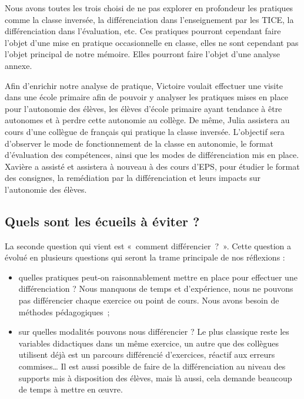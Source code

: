
Nous avons toutes les trois choisi de ne pas explorer en profondeur les pratiques comme la classe inversée, la différenciation dans l’enseignement par les TICE, la différenciation dans l’évaluation, etc. Ces pratiques pourront cependant faire l’objet d’une mise en pratique occasionnelle en classe, elles ne sont cependant pas l’objet principal de notre mémoire. Elles pourront faire l’objet d’une analyse annexe.

Afin d’enrichir notre analyse de pratique, Victoire voulait effectuer une visite dans une école primaire afin de pouvoir y analyser les pratiques mises en place pour l’autonomie des élèves, les élèves d’école primaire ayant tendance à être autonomes et à perdre cette autonomie au collège. De même, Julia assistera au cours d’une collègue de français qui pratique la classe inversée. L’objectif sera d’observer le mode de fonctionnement de la classe en autonomie, le format d’évaluation des compétences, ainsi que les modes de différenciation mis en place. Xavière a assisté et assistera à nouveau à des cours d’EPS, pour étudier le format des consignes, la remédiation par la différenciation et leurs impacts sur l’autonomie des élèves.

\subsection{Quels sont les écueils à éviter ?}


La seconde question qui vient est « comment différencier ? ». Cette question a évolué en plusieurs questions qui seront la trame principale de nos réflexions :
\begin{itemize}
    \item quelles pratiques peut-on raisonnablement mettre en place pour effectuer une différenciation ? Nous manquons de temps et d’expérience, nous ne pouvons pas différencier chaque exercice ou point de cours. Nous avons besoin de méthodes pédagogiques ;
    \item sur quelles modalités pouvons nous différencier ? Le plus classique reste les variables didactiques dans un même exercice, un autre que des collègues utilisent déjà est un parcours différencié d’exercices, réactif aux erreurs commises… Il est aussi possible de faire de la différenciation au niveau des supports mis à disposition des élèves, mais là aussi, cela demande beaucoup de temps à mettre en œuvre.
\end{itemize}


